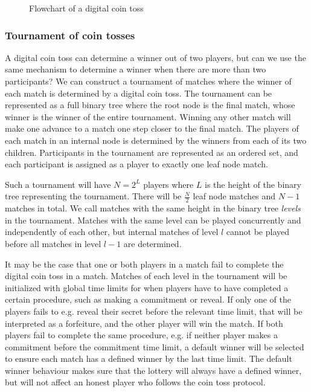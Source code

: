 \begin{figure}[htbp]
  \centering
  
  \caption{Flowchart of a digital coin toss}
  \label{fig:digital-coin-toss-flow}
\end{figure}

\subsubsection{Tournament of coin tosses}
A digital coin toss can determine a winner out of two players, but can we use the same mechanism to determine a winner when there are more than two participants? We can construct a tournament of matches where the winner of each match is determined by a digital coin toss. The tournament can be represented as a full binary tree where the root node is the final match, whose winner is the winner of the entire tournament. Winning any other match will make one advance to a match one step closer to the final match. The players of each match in an internal node is determined by the winners from each of its two children. Participants in the tournament are represented as an ordered set, and each participant is assigned as a player to exactly one leaf node match. 

Such a tournament will have $N=2^L$ players where $L$ is the height of the binary tree representing the tournament. There will be $\frac{N}{2}$ leaf node matches and $N-1$ matches in total. We call matches with the same height in the binary tree \emph{levels} in the tournament. Matches with the same level can be played concurrently and independently of each other, but internal matches of level $l$ cannot be played before all matches in level $l-1$ are determined.

It may be the case that one or both players in a match fail to complete the digital coin toss in a match. Matches of each level in the tournament will be initialized with global time limits for when players have to have completed a certain procedure, such as making a commitment or reveal. If only one of the players fails to e.g. reveal their secret before the relevant time limit, that will be interpreted as a forfeiture, and the other player will win the match. If both players fail to complete the same procedure, e.g. if neither player makes a commitment before the commitment time limit, a default winner will be selected to ensure each match has a defined winner by the last time limit. The default winner behaviour makes sure that the lottery will always have a defined winner, but will not affect an honest player who follows the coin toss protocol.

